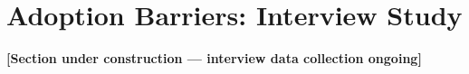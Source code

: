 \section{Adoption Barriers: Interview Study}
\label{sec:interviews}

%
%
%
%
%
%
\textbf{[Section under construction --- interview data collection ongoing]}
